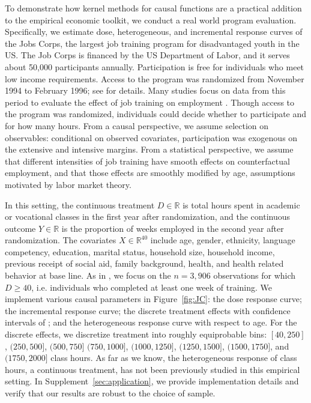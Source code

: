 To demonstrate how kernel methods for causal functions are a practical addition to the empirical economic toolkit, we conduct a real world program evaluation. Specifically, we estimate dose, heterogeneous, and incremental response curves of the Jobs Corps, the largest job training program for disadvantaged youth in the US. The Job Corps is financed by the US Department of Labor, and it serves about 50,000 participants annually. Participation is free for individuals who meet low income requirements. Access to the program was randomized from November 1994 to February 1996; see \cite{schochet2008does} for details. Many studies focus on data from this period to evaluate the effect of job training on employment \cite{flores2012estimating,colangelo2020double}. Though access to the program was randomized, individuals could decide whether to participate and for how many hours. From a causal perspective, we assume selection on observables: conditional on observed covariates, participation was exogenous on the extensive and intensive margins. From a statistical perspective, we assume that different intensities of job training have smooth effects on counterfactual employment, and that those effects are smoothly modified by age, assumptions motivated by labor market theory.

In this setting, the continuous treatment $D\in\mathbb{R}$ is total hours spent in academic or vocational classes in the first year after randomization, and the continuous outcome $Y\in\mathbb{R}$ is the proportion of weeks employed in the second year after randomization. The covariates $X\in\mathbb{R}^{40}$ include age, gender, ethnicity, language competency, education, marital
status, household size, household income, previous receipt of social aid, family background, health, and health related behavior at base line. As in \cite{colangelo2020double}, we focus on the $n=3,906$ observations for which $D\geq 40$, i.e. individuals who completed at least one week of training. We implement various causal parameters in Figure~\ref{fig:JC}: the dose response curve; the incremental response curve; the discrete treatment effects with confidence intervals of \cite{singh2021debiased}; and the heterogeneous response curve with respect to age. For the discrete effects, we discretize treatment into roughly equiprobable bins: $[40,250]$, $(250,500]$, $(500,750]$ $(750,1000]$, $(1000,1250]$, $(1250,1500]$, $(1500,1750]$, and $(1750,2000]$ class hours. As far as we know, the heterogeneous response of class hours, a continuous treatment, has not been previously studied in this empirical setting. In Supplement~\ref{sec:application}, we provide implementation details and verify that our results are robust to the choice of sample.

